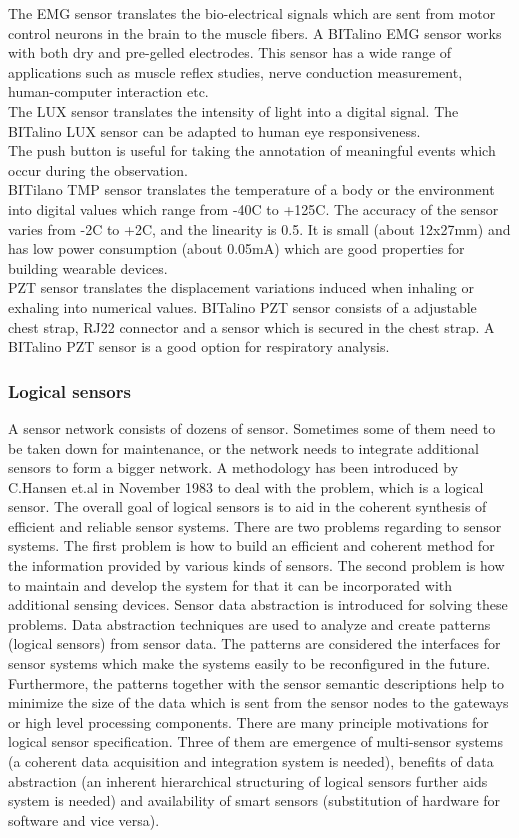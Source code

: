             The EMG sensor translates the bio-electrical signals which are sent from motor control neurons in the brain to the muscle fibers. A BITalino EMG sensor works with both dry and pre-gelled electrodes. This sensor has a wide range of applications such as muscle reflex studies, nerve conduction measurement, human-computer interaction etc.\\
            The LUX sensor translates the intensity of light into a digital signal. The BITalino LUX sensor can be adapted to human eye responsiveness.\\
            The push button is useful for taking the annotation of meaningful events which occur during the observation.\\
            BITilano TMP sensor translates the temperature of a body or the environment into digital values which range from -40C to +125C. The accuracy of the sensor varies from -2C to +2C, and the linearity is 0.5. It is small (about 12x27mm) and has low power consumption (about 0.05mA) which are good properties for building wearable devices.\\
            PZT sensor translates the displacement variations induced when inhaling or exhaling into numerical values. BITalino PZT sensor consists of a adjustable chest strap, RJ22 connector and a sensor which is secured in the chest strap. A BITalino PZT sensor is a good option for respiratory analysis.
        \subsubsection{Logical sensors}
            A sensor network consists of dozens of sensor. Sometimes some of them need to be taken down for maintenance, or the network needs to integrate additional sensors to form a bigger network. A methodology has been introduced by C.Hansen et.al\citep{LOGICALSENSOR_1} in November 1983 to deal with the problem, which is a logical sensor. The overall goal of logical sensors is to aid in the coherent synthesis of efficient and reliable sensor systems. There are two problems regarding to sensor systems\citep{LOGICALSENSOR_0}. The first problem is how to build an efficient and coherent method for the information provided by various kinds of sensors. The second problem is how to maintain and develop the system for that it can be incorporated with additional sensing devices. Sensor data abstraction is introduced for solving these problems. Data abstraction techniques are used to analyze and create patterns (logical sensors) from sensor data\citep{SensorDataAbstract}. The patterns are considered the interfaces for sensor systems which make the systems easily to be reconfigured in the future. Furthermore, the patterns together with the sensor semantic descriptions help to minimize the size of the data which is sent from the sensor nodes to the gateways or high level processing components. There are many principle motivations for logical sensor specification. Three of them are emergence of multi-sensor systems (a coherent data acquisition and integration system is needed), benefits of data abstraction (an inherent hierarchical structuring of logical sensors further aids system is needed) and availability of smart sensors (substitution of hardware for software and vice versa)\citep{LOGICALSENSOR_3}.
